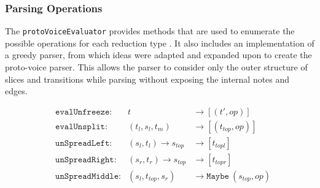 \documentclass[12pt,a4paper,twoside,openany]{report} \usepackage[pdfborder={0 0 0}]{hyperref}    %
\theoremstyle{definition} \newtheorem{definition}{Definition}[section]
\begin{document}
      \subsubsection{Parsing Operations} The \texttt{protoVoiceEvaluator}
      \cite{finkensiepModelingInferringProtovoice2021} provides methods that are used to enumerate the possible
      operations for each reduction type \footnotemark. It also includes an implementation of a greedy parser, from
      which ideas were adapted and expanded upon to create the proto-voice parser. This allows the parser to consider
      only the outer structure of slices and transitions while parsing without exposing the internal notes and edges.

      \begin{equation} 
        \begin{aligned} 
          &\texttt{evalUnfreeze}: &t &\to [(t', op)]\\ 
          &\texttt{evalUnsplit}: &(t_l, s_l, t_m) &\to [(t_{top}, op)]\\ 
          &\texttt{unSpreadLeft}: &(s_l, t_l) \to s_{top} &\to [t_{topl}]  \\
                  &\texttt{unSpreadRight}: &(s_r, t_r) \to s_{top} &\to [t_{topr}]  \\
                  &\texttt{unSpreadMiddle}:
                  &(s_l,t_{top},s_r) &\to \texttt{Maybe}~(s_{top}, op)  \\ 
        \end{aligned} 
        \label{eq:pvOps}
      \end{equation}
\end{document}
